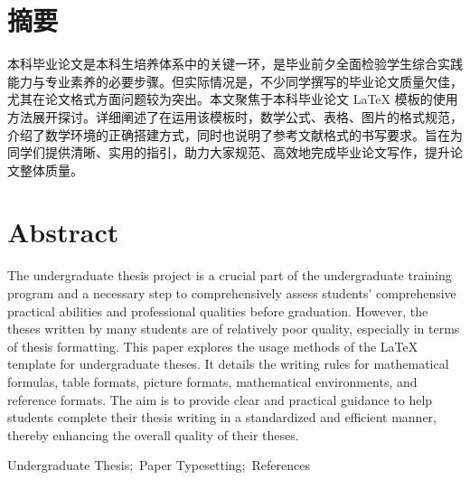 \documentclass{JYU} %
\author{张三} %
\begin{document}
    \makecover
    \cleardoublepage 
    \section*{摘要}
	本科毕业论文是本科生培养体系中的关键一环，是毕业前夕全面检验学生综合实践能力与专业素养的必要步骤。但实际情况是，不少同学撰写的毕业论文质量欠佳，尤其在论文格式方面问题较为突出。本文聚焦于本科毕业论文 \LaTeX {} 模板的使用方法展开探讨。详细阐述了在运用该模板时，数学公式、表格、图片的格式规范，介绍了数学环境的正确搭建方式，同时也说明了参考文献格式的书写要求。旨在为同学们提供清晰、实用的指引，助力大家规范、高效地完成毕业论文写作，提升论文整体质量。
    
    \vspace{0.2cm}	
	
    \clearpage
    \section*{Abstract}
	The undergraduate thesis project is a crucial part of the undergraduate training program and a necessary step to comprehensively assess students' comprehensive practical abilities and professional qualities before graduation. However, the theses written by many students are of relatively poor quality, especially in terms of thesis formatting. 
	This paper explores the usage methods of the LaTeX template for undergraduate theses. It details the writing rules for mathematical formulas, table formats, picture formats, mathematical environments, and reference formats. The aim is to provide clear and practical guidance to help students complete their thesis writing in a standardized and efficient manner, thereby enhancing the overall quality of their theses. 
    
    \vspace{0.2cm}	
    Undergraduate Thesis;~Paper Typesetting;~References
\end{document}
